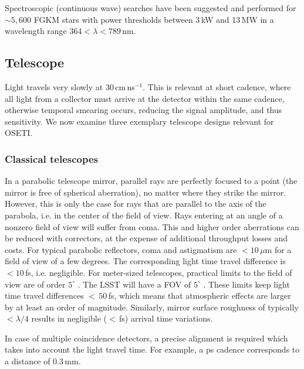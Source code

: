 \documentclass[twocolumn,tighten,longauthor]{myaastex62}
\begin{document}
Spectroscopic (continuous wave) searches have been suggested \citep{1993ASPC...47..373B} and performed \citep{2002PASP..114..416R,2017AJ....153..251T} for $\sim5{,}600$ FGKM stars with power thresholds between 3\,kW and 13\,MW in a wavelength range $364 < \lambda < 789$\,nm.


\subsection{Telescope}
\label{sub:telescopes}
Light travels very slowly at 30\,cm\,ns$^{-1}$. This is relevant at short cadence, where all light from a collector must arrive at the detector within the same cadence, otherwise temporal smearing occurs, reducing the signal amplitude, and thus sensitivity. We now examine three exemplary telescope designs relevant for OSETI.


\subsubsection{Classical telescopes}
\label{sub:classical_telescope}
In a parabolic telescope mirror, parallel rays are perfectly focused to a point (the mirror is free of spherical aberration), no matter where they strike the mirror. However, this is only the case for rays that are parallel to the axis of the parabola, i.e. in the center of the field of view. Rays entering at an angle of a nonzero field of view will suffer from coma. This and higher order aberrations can be reduced with correctors, at the expense of additional throughput losses and costs. For typical parabolic reflectors, coma and astigmatism are $<10\,\mu$m for a field of view of a few degrees. The corresponding light time travel difference is $<10\,$fs, i.e. negligible. For meter-sized telescopes, practical limits to the field of view are of order $5^{\circ}$ \citep{2009JRASC.103...54R}. The LSST will have a FOV of $5^{\circ}$ \citep{2004SPIE.5489..705C,2016SPIE.9906E..0QN}. These limits keep light time travel differences $<\,50\,$fs, which means that atmospheric effects are larger by at least an order of magnitude. Similarly, mirror surface roughness of typically $<\lambda/4$ results in negligible ($<\,$fs) arrival time variations.

In case of multiple coincidence detectors, a precise alignment is required which takes into account the light travel time. For example, a ps cadence corresponds to a distance of 0.3\,mm.
\end{document}
